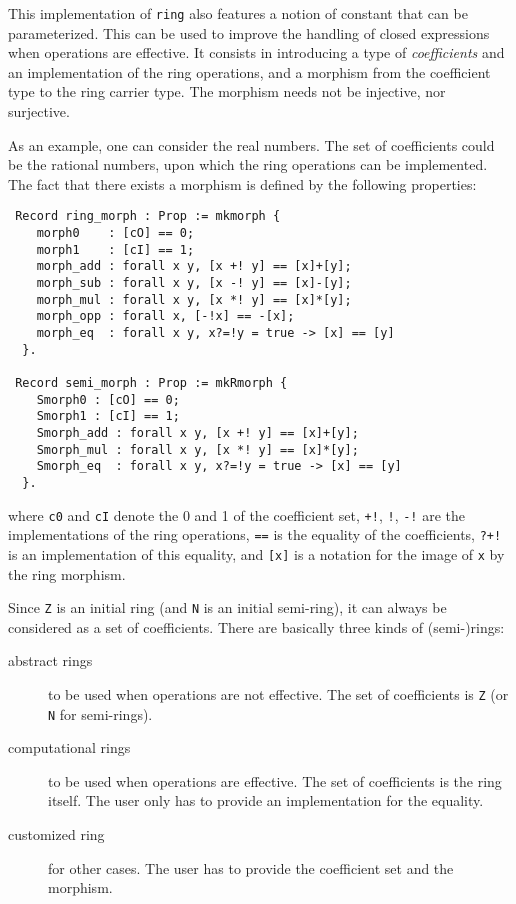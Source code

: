 This implementation of {\tt ring} also features a notion of constant
that can be parameterized. This can be used to improve the handling of
closed expressions when operations are effective. It consists in
introducing a type of \emph{coefficients} and an implementation of the
ring operations, and a morphism from the coefficient type to the ring
carrier type. The morphism needs not be injective, nor surjective.  

As
an example, one can consider the real numbers. The set of coefficients
could be the rational numbers, upon which the ring operations can be
implemented. The fact that there exists a morphism is defined by the
following properties:
\begin{verbatim}
 Record ring_morph : Prop := mkmorph {
    morph0    : [cO] == 0;
    morph1    : [cI] == 1;
    morph_add : forall x y, [x +! y] == [x]+[y];
    morph_sub : forall x y, [x -! y] == [x]-[y];
    morph_mul : forall x y, [x *! y] == [x]*[y];
    morph_opp : forall x, [-!x] == -[x];
    morph_eq  : forall x y, x?=!y = true -> [x] == [y] 
  }.

 Record semi_morph : Prop := mkRmorph {
    Smorph0 : [cO] == 0;
    Smorph1 : [cI] == 1;
    Smorph_add : forall x y, [x +! y] == [x]+[y];
    Smorph_mul : forall x y, [x *! y] == [x]*[y];
    Smorph_eq  : forall x y, x?=!y = true -> [x] == [y] 
  }.
\end{verbatim}
where {\tt c0} and {\tt cI} denote the 0 and 1 of the coefficient set,
{\tt +!}, {\tt *!}, {\tt -!} are the implementations of the ring
operations, {\tt ==} is the equality of the coefficients, {\tt ?+!} is
an implementation of this equality, and {\tt [x]} is a notation for
the image of {\tt x} by the ring morphism.



Since {\tt Z} is an initial ring (and {\tt N} is an initial
semi-ring), it can always be considered as a set of
coefficients. There are basically three kinds of (semi-)rings:
\begin{description}
\item[abstract rings] to be used when operations are not
  effective. The set of coefficients is {\tt Z} (or {\tt N} for
  semi-rings).
\item[computational rings] to be used when operations are
  effective. The set of coefficients is the ring itself. The user only
  has to provide an implementation for the equality.
\item[customized ring] for other cases. The user has to provide the
  coefficient set and the morphism.
\end{description}

